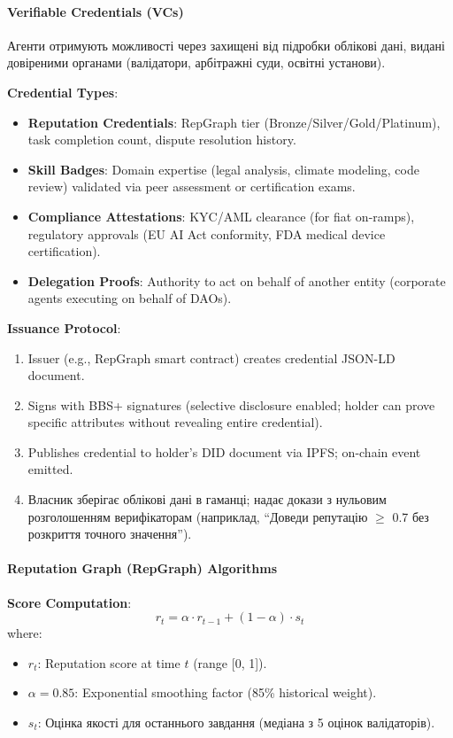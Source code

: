 \documentclass[11pt]{article}
\begin{document}
\paragraph{Verifiable Credentials (VCs)}
Агенти отримують можливості через захищені від підробки облікові дані, видані довіреними органами (валідатори, арбітражні суди, освітні установи).

\textbf{Credential Types}:
\begin{itemize}[noitemsep]
  \item \textbf{Reputation Credentials}: RepGraph tier (Bronze/Silver/Gold/Platinum), task completion count, dispute resolution history.
  \item \textbf{Skill Badges}: Domain expertise (legal analysis, climate modeling, code review) validated via peer assessment or certification exams.
  \item \textbf{Compliance Attestations}: KYC/AML clearance (for fiat on-ramps), regulatory approvals (EU AI Act conformity, FDA medical device certification).
  \item \textbf{Delegation Proofs}: Authority to act on behalf of another entity (corporate agents executing on behalf of DAOs).
\end{itemize}

\textbf{Issuance Protocol}:
\begin{enumerate}[noitemsep]
  \item Issuer (e.g., RepGraph smart contract) creates credential JSON-LD document.
  \item Signs with BBS+ signatures (selective disclosure enabled; holder can prove specific attributes without revealing entire credential).
  \item Publishes credential to holder's DID document via IPFS; on-chain event emitted.
  \item Власник зберігає облікові дані в гаманці; надає докази з нульовим розголошенням верифікаторам (наприклад, ``Доведи репутацію $\geq$ 0.7 без розкриття точного значення'').
\end{enumerate}

\paragraph{Reputation Graph (RepGraph) Algorithms}

\textbf{Score Computation}:
\begin{equation}
r_t = \alpha \cdot r_{t-1} + (1 - \alpha) \cdot s_t
\end{equation}
where:
\begin{itemize}[noitemsep]
  \item $r_t$: Reputation score at time $t$ (range [0, 1]).
  \item $\alpha = 0.85$: Exponential smoothing factor (85\% historical weight).
  \item $s_t$: Оцінка якості для останнього завдання (медіана з 5 оцінок валідаторів).
\end{itemize}
\end{document}
